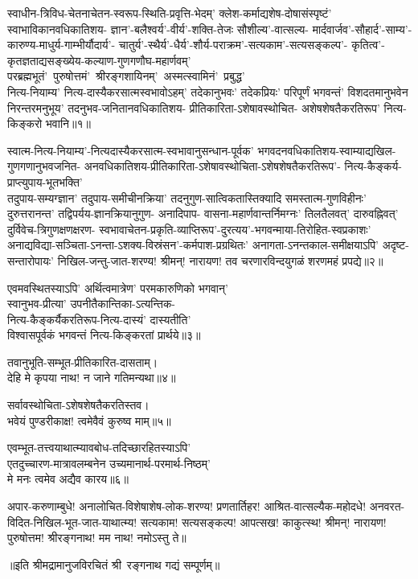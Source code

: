 
\begin{flushleft}
स्वाधीन-त्रिविध-चेतनाचेतन-स्वरूप-स्थिति-प्रवृत्ति-भेदम्'
क्लेश-कर्माद्यशेष-दोषासंस्पृष्टं' स्वाभाविकानवधिकातिशय-
ज्ञान'-बलैश्वर्य'-वीर्य'-शक्ति-तेजः सौशील्य'-वात्सल्य-
मार्दवार्जव'-सौहार्द'-साम्य'-कारुण्य-माधुर्य-गाम्भीर्यौदार्य'-
चातुर्य'-स्थैर्य'-धैर्य'-शौर्य-पराक्रम'-सत्यकाम'-सत्यसङ्कल्प'-
कृतित्व'-कृतज्ञताद्यसङ्ख्येय-कल्याण-गुणगणौघ-महार्णवम्'
\mbox{परब्रह्मभूतं' पुरुषोत्तमं' श्रीरङ्गशायिनम्' अस्मत्स्वामिनं' प्रबुद्ध'}\\
नित्य-नियाम्य' नित्य-दास्यैकरसात्मस्वभावोऽहम्'
तदेकानुभवः' तदेकप्रियः' परिपूर्णं भगवन्तं'
विशदतमानुभवेन निरन्तरमनुभूय' तदनुभव-जनितानवधिकातिशय-%
प्रीतिकारिता-ऽशेषावस्थोचित-
अशेषशेषतैकरतिरूप' नित्य-किङ्करो भवानि॥१॥


स्वात्म-नित्य-नियाम्य'-नित्यदास्यैकरसात्म-स्वभावानुसन्धान-पूर्वक'
भगवदनवधिकातिशय-स्वाम्याद्यखिल-गुणगणानुभवजनित-
अनवधिकातिशय-प्रीतिकारिता-ऽशेषावस्थोचिता-ऽशेषशेषतैकरतिरूप'-%
नित्य-कैङ्कर्य-प्राप्त्युपाय-भूतभक्ति'\\
तदुपाय-सम्यग्ज्ञान' तदुपाय-समीचीनक्रिया'
तदनुगुण-सात्विकतास्तिक्यादि समस्तात्म-गुणविहीनः'
दुरुत्तरानन्त' तद्विपर्यय-ज्ञानक्रियानुगुण-%
अनादिपाप- वासना-महार्णवान्तर्निमग्नः'
तिलतैलवत्' दारुवह्निवत्' दुर्विवेच-त्रिगुणक्षणक्षरण-%
स्वभावाचेतन-प्रकृति-व्याप्तिरूप'-दुरत्यय'-भगवन्माया-तिरोहित-स्वप्रकाशः'
अनाद्यविद्या-सञ्चिता-ऽनन्ता-ऽशक्य-विस्रंसन'-कर्मपाश-प्रग्रथितः'
अनागता-ऽनन्तकाल-समीक्षयाऽपि' अदृष्ट-सन्तारोपायः'
निखिल-जन्तु-जात-शरण्य! श्रीमन्! नारायण!
तव चरणारविन्दयुगळं शरणमहं प्रपद्ये॥२॥

एवमवस्थितस्याऽपि' अर्थित्वमात्रेण' परमकारुणिको भगवान्'\\
स्वानुभव-प्रीत्या' उपनीतैकान्तिका-ऽत्यन्तिक-\\
नित्य-कैङ्कर्यैकरतिरूप-नित्य-दास्यं' दास्यतीति' \\
विश्वासपूर्वकं भगवन्तं नित्य-किङ्करतां प्रार्थये॥३॥

तवानुभूति-सम्भूत-प्रीतिकारित-दासताम्।\\
देहि मे कृपया नाथ! न जाने गतिमन्यथा॥४॥

सर्वावस्थोचिता-ऽशेषशेषतैकरतिस्तव।\\
भवेयं पुण्डरीकाक्ष! त्वमेवैवं कुरुष्व माम्॥५॥

एवम्भूत-तत्त्वयाथात्म्यावबोध-तदिच्छारहितस्याऽपि'\\
एतदुच्चारण-मात्रावलम्बनेन उच्यमानार्थ-परमार्थ-निष्ठम्'\\
मे मनः त्वमेव अद्यैव कारय॥६॥

अपार-करुणाम्बुधे! अनालोचित-विशेषाशेष-लोक-शरण्य!
प्रणतार्तिहर! आश्रित-वात्सल्यैक-महोदधे! 
अनवरत-विदित-निखिल-भूत-जात-याथात्म्य!
सत्यकाम! सत्यसङ्कल्प! आपत्सख! काकुत्स्थ! श्रीमन्!
नारायण! पुरुषोत्तम! श्रीरङ्गनाथ! मम नाथ! नमोऽस्तु ते॥
\end{flushleft}
\centerline{॥इति श्रीमद्रामानुजविरचितं श्री~रङ्गनाथ गद्यं सम्पूर्णम्॥}
